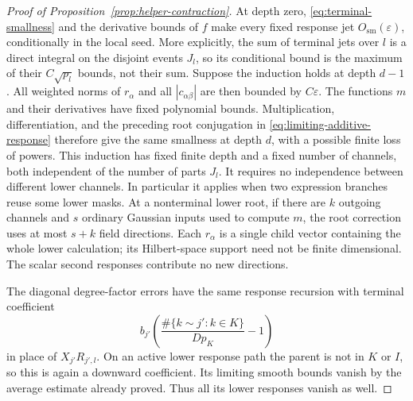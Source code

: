 \begin{proof}[Proof of Proposition~\ref{prop:helper-contraction}]
At depth zero, \eqref{eq:terminal-smallness} and the derivative
bounds of \(f\) make every fixed response jet
\(O_{\mathrm{sm}}(\varepsilon)\), conditionally in the local
seed.  More explicitly, the sum of terminal jets over \(l\) is a
direct integral on the disjoint events \(J_l\), so its conditional
bound is the maximum of their \(C\sqrt{p_l}\) bounds, not their
sum.  Suppose the induction holds at depth \(d-1\).  All weighted norms of
\(r_\alpha\) and all \(|c_{\alpha\beta}|\) are then bounded by
\(C\varepsilon\).  The functions \(m\) and their derivatives have
fixed polynomial bounds.  Multiplication, differentiation, and the
preceding root conjugation in
\eqref{eq:limiting-additive-response} therefore give the same
smallness at depth \(d\), with a possible finite loss of powers.
This induction has fixed finite depth and a fixed number of channels,
both independent of the number of parts \(J_l\).  It requires no
independence between different lower channels.  In particular it
applies when two expression branches reuse some lower masks.  At a
nonterminal lower root, if there are \(k\) outgoing channels and \(s\) ordinary Gaussian
inputs used to compute \(m\), the root correction uses at most
\(s+k\) field directions.  Each \(r_\alpha\) is a single child
vector containing the whole lower calculation; its Hilbert-space
support need not be finite dimensional.  The scalar second
responses contribute no new directions.

The diagonal degree-factor errors have the same response recursion
with terminal coefficient
\[
 b_{j'}\left(\frac{\#\{k\sim j':k\in K\}}{Dp_K}-1\right)
\]
in place of \(X_{j'}R_{j',l}\).  On an active lower response path
the parent is not in \(K\) or \(I\), so this is again a downward
coefficient.  Its limiting smooth bounds vanish by the average
estimate already proved.  Thus all its lower responses vanish as
well.


\end{proof}
